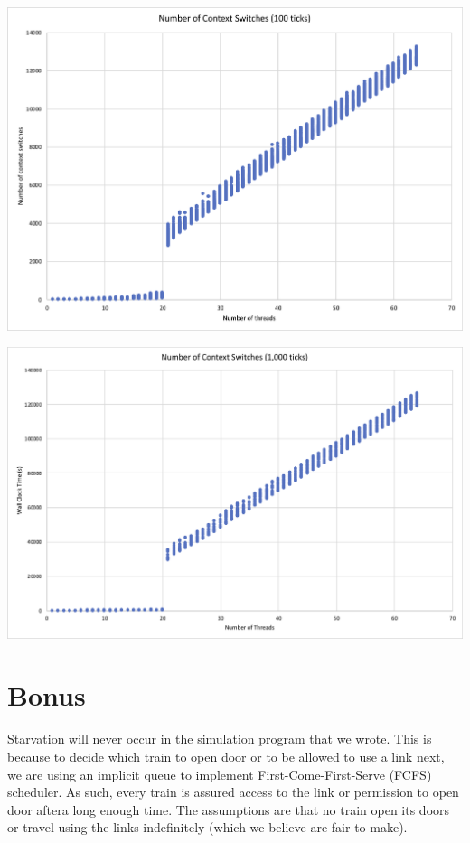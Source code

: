 \documentclass[a4paper,12pt]{article}
\begin{document}
	\newpage
	\begin{center}
		\includegraphics[width=0.9\linewidth]{100-cs}
	\end{center}
	\begin{center}
		\includegraphics[width=0.9\linewidth]{1000-cs}
	\end{center}
	
	\section{Bonus}
	Starvation will never occur in the simulation program that we wrote. This is because to decide which train to open door or to be allowed to use a link next, we are using an implicit queue to implement First-Come-First-Serve (FCFS) scheduler. As such, every train is assured access to the link or permission to open door aftera long enough time. The assumptions are that no train open its doors or travel using the links indefinitely (which we believe are fair to make).
\end{document}
